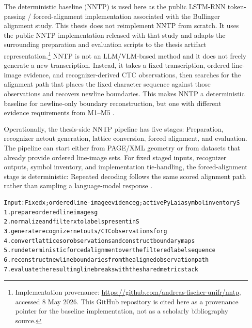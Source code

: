 The deterministic baseline (NNTP) is used here as the public LSTM-RNN token-passing / forced-alignment implementation associated with the Bullinger alignment study. This thesis does not reimplement NNTP from scratch. It uses the public NNTP implementation released with that study and adapts the surrounding preparation and evaluation scripts to the thesis artifact representation.\footnote{Implementation provenance: \url{https://github.com/andreas-fischer-unifr/nntp}, accessed 8 May 2026. This GitHub repository is cited here as a provenance pointer for the baseline implementation, not as a scholarly bibliography source.} NNTP is not an LLM/VLM-based method and it does not freely generate a new transcription. Instead, it takes a fixed transcription, ordered line-image evidence, and recognizer-derived CTC observations, then searches for the alignment path that places the fixed character sequence against those observations and recovers newline boundaries. This makes NNTP a deterministic baseline for newline-only boundary reconstruction, but one with different evidence requirements from M1--M5 .

Operationally, the thesis-side NNTP pipeline has five stages: Preparation, recognizer netout generation, lattice conversion, forced alignment, and evaluation. The pipeline can start either from PAGE/XML geometry or from datasets that already provide ordered line-image sets. For fixed staged inputs, recognizer outputs, symbol inventory, and implementation tie-handling, the forced-alignment stage is deterministic: Repeated decoding follows the same scored alignment path rather than sampling a language-model response .

\begin{algorithm}[htbp]
  \caption{Concise NNTP forced-alignment pipeline.}
  \label{alg:method_nntp_pipeline}
  \begin{minipage}{0.96\linewidth}
    \footnotesize
\begin{alltt}
Input: Fixed x; ordered line-image evidence g; active PyLaia symbol inventory S
1. prepare ordered line images g
2. normalize and filter x to labels present in S
3. generate recognizer netouts / CTC observations for g
4. convert lattices or observations and construct boundary maps
5. run deterministic forced alignment over the filtered label sequence
6. reconstruct newline boundaries from the aligned observation path
7. evaluate the resulting line breaks with the shared metric stack
\end{alltt}
  \end{minipage}
\end{algorithm}

